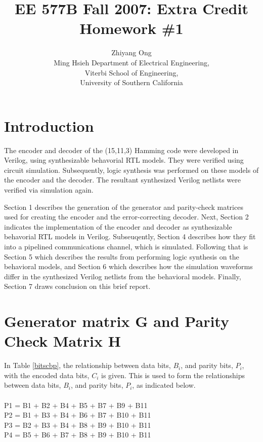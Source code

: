 \documentclass[ee577b,acmnow]{acmtrans2m}
\title{EE 577B Fall 2007: Extra Credit Homework \#1}
\author{Zhiyang Ong\\
Ming Hsieh Department of Electrical Engineering,\\
Viterbi School of Engineering,\\
University of Southern California
}
\begin{document}
\setcounter{page}{1}
            

            
\maketitle

\section{Introduction}

The encoder and decoder of the (15,11,3) Hamming code \cite{Weste05} were
developed in Verilog, using synthesizable behavorial RTL models.
They were verified using circuit simulation. Subsequently,
logic synthesis was performed on these models of the encoder
and the decoder. The resultant synthesized Verilog netlists
were verified via simulation again.

Section 1 describes the generation of the generator and parity-check
matrices used for creating the encoder and the error-correcting decoder.
Next, Section 2 indicates the implementation of the encoder and decoder as
synthesizable behavorial RTL models in Verilog. Subseuqently, Section 4
describes how they fit into a pipelined communications channel, which
is simulated. Following that is Section 5 which describes the results
from performing logic synthesis on the behavioral models, and Section
6 which describes how the simulation waveforms differ in the synthesized
Verilog netlists from the behavioral models. Finally, Section 7 draws
conclusion on this brief report.

\section{Generator matrix G and Parity Check Matrix H}

In Table \ref{bitscbp}, the relationship between data bits, $B_{i}$, and parity bits, $P_{i}$, with the encoded data bits, $C_{i}$ is given. This is used to form the relationships between data bits, $B_{i}$, and parity bits, $P_{i}$, as indicated below.\\
\ \\
P1 = B1 + B2 + B4 + B5 + B7 + B9 + B11\\
P2 = B1 + B3 + B4 + B6 + B7 + B10 + B11\\
P3 = B2 + B3 + B4 + B8 + B9 + B10 + B11\\
P4 = B5 + B6 + B7 + B8 + B9 + B10 + B11\\
\end{document}
